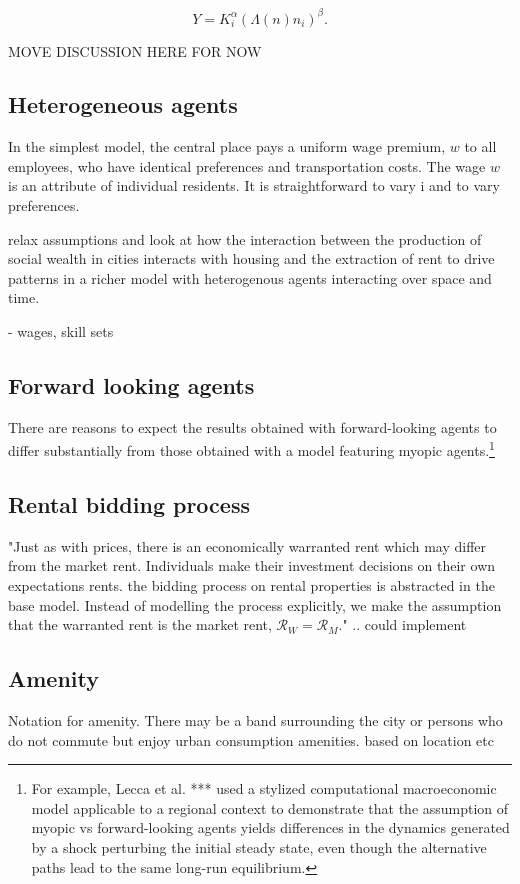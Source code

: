 \begin{equation}
Y=K_i^{\alpha }(\Lambda(n)n_i)^{\beta }.
\end{equation}

MOVE DISCUSSION HERE FOR NOW

\subsection{Heterogeneous agents}
In the simplest model, the central place pays a uniform wage premium, $w$ to all employees, who have identical preferences and transportation costs. 
The wage $w$ is an attribute of individual residents.  
It is straightforward to vary i and to vary preferences. 

relax assumptions and look at how the interaction between the production of social wealth in cities interacts with housing and the extraction of rent to drive patterns in a richer model with heterogenous agents interacting over space and time. 

- wages, skill sets

\subsection{Forward looking agents}
There are reasons to expect the results obtained with  forward-looking agents to differ substantially from those obtained with a model featuring myopic agents.\footnote{For example, Lecca et al. *** \cite{LOST-Lecca-et-al-2013}  used a stylized computational macroeconomic model applicable to a regional context to demonstrate that the assumption of myopic vs forward-looking agents yields differences in the dynamics generated by a shock perturbing the initial steady state, even though the alternative paths lead to the same long-run equilibrium.} 

\subsection{Rental bidding process}
 "Just as with prices, there is an economically \gls{warranted rent} which may differ from the \gls{market rent}. Individuals make their investment decisions on their own expectations rents. the bidding process on rental properties is abstracted in the base model. Instead of modelling the process explicitly, we make the assumption that the warranted rent is the market rent, $\mathcal{R}_W = \mathcal{R}_M$." .. could implement

\subsection{Amenity}
Notation for amenity.
There may be a band surrounding the city or persons who do not commute but enjoy urban consumption amenities. 
based on location etc

